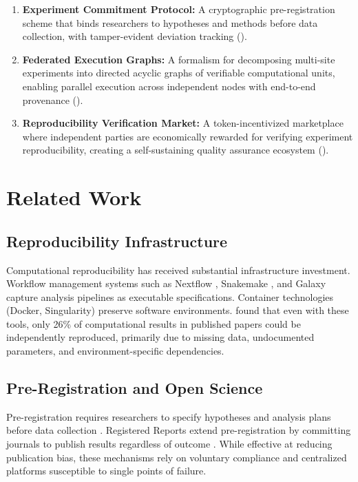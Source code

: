 \documentclass[11pt,a4paper]{article}
\begin{document}
\begin{enumerate}[leftmargin=*]
    \item \textbf{Experiment Commitment Protocol:} A cryptographic pre-registration scheme that binds researchers to hypotheses and methods before data collection, with tamper-evident deviation tracking ().
    \item \textbf{Federated Execution Graphs:} A formalism for decomposing multi-site experiments into directed acyclic graphs of verifiable computational units, enabling parallel execution across independent nodes with end-to-end provenance ().
    \item \textbf{Reproducibility Verification Market:} A token-incentivized marketplace where independent parties are economically rewarded for verifying experiment reproducibility, creating a self-sustaining quality assurance ecosystem ().
\end{enumerate}

\section{Related Work}
\label{sec:related}

\subsection{Reproducibility Infrastructure}

Computational reproducibility has received substantial infrastructure investment.
Workflow management systems such as Nextflow \citep{ditommaso2017nextflow}, Snakemake \citep{molder2021sustainable}, and Galaxy \citep{afgan2018galaxy} capture analysis pipelines as executable specifications.
Container technologies (Docker, Singularity) preserve software environments.
\citet{stodden2018empirical} found that even with these tools, only 26\% of computational results in published papers could be independently reproduced, primarily due to missing data, undocumented parameters, and environment-specific dependencies.

\subsection{Pre-Registration and Open Science}

Pre-registration requires researchers to specify hypotheses and analysis plans before data collection \citep{nosek2018preregistration}.
Registered Reports extend pre-registration by committing journals to publish results regardless of outcome \citep{chambers2013registered}.
While effective at reducing publication bias, these mechanisms rely on voluntary compliance and centralized platforms susceptible to single points of failure.
\end{document}
